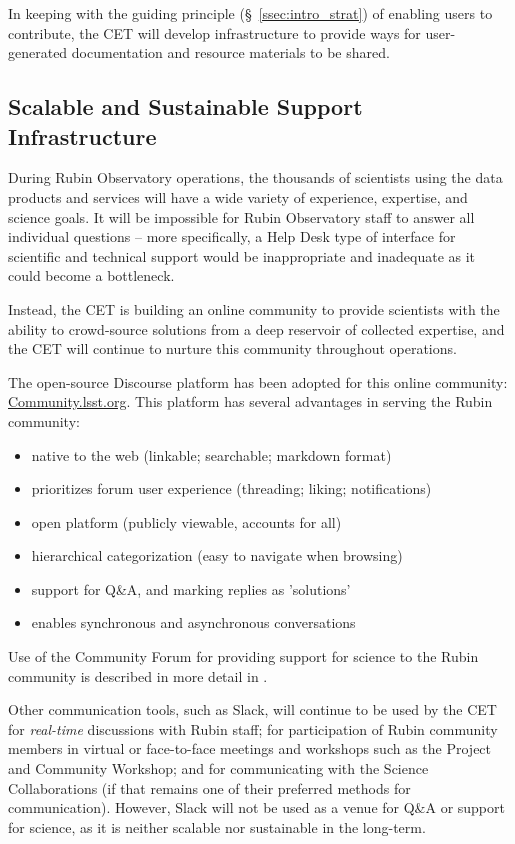 \documentclass[DM,lsstdraft,toc]{lsstdoc}
\begin{document}
In keeping with the guiding principle (\S~\ref{ssec:intro_strat}) of enabling users to contribute, the CET will develop infrastructure to provide ways for user-generated documentation and resource materials to be shared.


\subsection{Scalable and Sustainable Support Infrastructure}\label{ssec:mod_support}

During Rubin Observatory operations, the thousands of scientists using the data products and services will have a wide variety of experience, expertise, and science goals.
It will be impossible for Rubin Observatory staff to answer all individual questions -- more specifically, a Help Desk type of interface for scientific and technical support would be inappropriate and inadequate as it could become a bottleneck.

Instead, the CET is building an online community to provide scientists with the ability to crowd-source solutions from a deep reservoir of collected expertise, and the CET will continue to nurture this community throughout operations.

The open-source Discourse platform has been adopted for this online community: \url{Community.lsst.org}.
This platform has several advantages in serving the Rubin community:
\begin{itemize}
\item native to the web (linkable; searchable; markdown format)
\item prioritizes forum user experience (threading; liking; notifications)
\item open platform (publicly viewable, accounts for all)
\item hierarchical categorization (easy to navigate when browsing)
\item support for Q\&A, and marking replies as 'solutions'
\item enables synchronous and asynchronous conversations
\end{itemize}

Use of the Community Forum for providing support for science to the Rubin community is described in more detail in .

Other communication tools, such as Slack, will continue to be used by the CET for \textit{real-time} discussions with Rubin staff; for participation of Rubin community members in virtual or face-to-face meetings and workshops such as the Project and Community Workshop; and for communicating with the Science Collaborations (if that remains one of their preferred methods for communication).
However, Slack will not be used as a venue for Q\&A or support for science, as it is neither scalable nor sustainable in the long-term.
\end{document}
